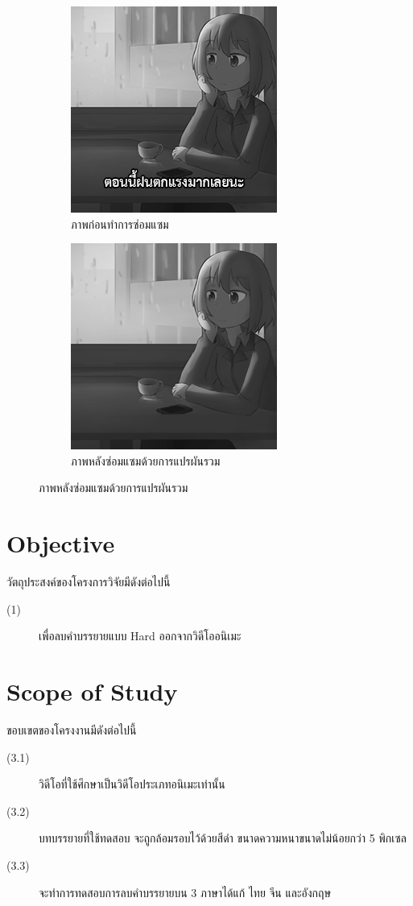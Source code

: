 \documentclass[hidelinks,a4paper,14pt]{article}
\numberwithin{equation}{section}							%
\begin{document}
{	\begin{figure}[H]
		\begin{subfigure}{0.4\linewidth}
			\centering
			\includegraphics[width=0.4\linewidth]{images/splitbergman-before.png}
			\caption{ภาพก่อนทำการซ่อมแซม}
		\end{subfigure}
		\begin{subfigure}{0.4\linewidth}
			\centering
			\includegraphics[width=0.4\linewidth]{images/splitbergman-after.png}
			\caption{ภาพหลังซ่อมแซมด้วยการแปรผันรวม}
		\end{subfigure}
	\end{figure}

\section{Objective}
วัตถุประสงค์ของโครงการวิจัยมีดังต่อไปนี้
\begin{description}
	\item[(1)] เพื่อลบคำบรรยายแบบ Hard ออกจากวิดีโออนิเมะ
\end{description}

\section{Scope of Study}
ขอบเขตของโครงงานมีดังต่อไปนี้
\begin{description}
\item[(3.1)] วิดีโอที่ใช้ศึกษาเป็นวิดีโอประเภทอนิเมะเท่านั้น
\item[(3.2)] บทบรรยายที่ใช้ทดสอบ จะถูกล้อมรอบไว้ด้วยสีดำ ขนาดความหนาขนาดไม่น้อยกว่า 5 พิกเซล
\item[(3.3)] จะทำการทดสอบการลบคำบรรยายบน 3 ภาษาได้แก้ ไทย จีน และอังกฤษ
\end{description}

}
\end{document}
